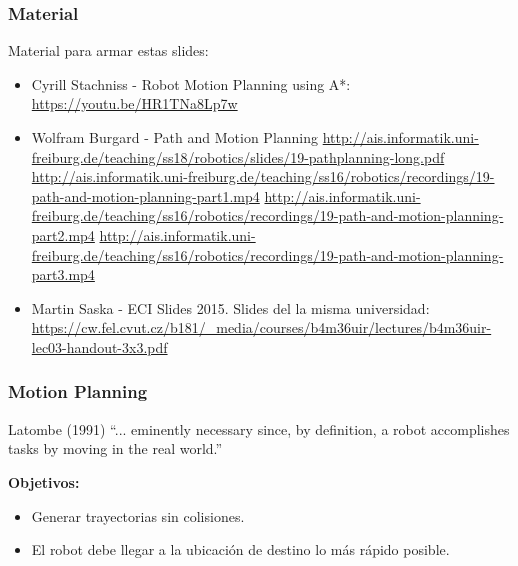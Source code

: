 \begin{frame}
	\frametitle{Material}
	
	Material para armar estas slides:
	\begin{itemize}
		\item Cyrill Stachniss - Robot Motion Planning using A*: \url{https://youtu.be/HR1TNa8Lp7w}
		\item Wolfram Burgard - Path and Motion Planning \url{http://ais.informatik.uni-freiburg.de/teaching/ss18/robotics/slides/19-pathplanning-long.pdf}
		\url{http://ais.informatik.uni-freiburg.de/teaching/ss16/robotics/recordings/19-path-and-motion-planning-part1.mp4}
		\url{http://ais.informatik.uni-freiburg.de/teaching/ss16/robotics/recordings/19-path-and-motion-planning-part2.mp4}
		\url{http://ais.informatik.uni-freiburg.de/teaching/ss16/robotics/recordings/19-path-and-motion-planning-part3.mp4}
		\item Martin Saska - ECI Slides 2015. Slides del la misma universidad: \url{https://cw.fel.cvut.cz/b181/_media/courses/b4m36uir/lectures/b4m36uir-lec03-handout-3x3.pdf}
	\end{itemize}
\end{frame}

\begin{frame}
	\frametitle{Motion Planning}
	
	\begin{block}{Latombe (1991)}
		``... eminently necessary since, by definition, a robot accomplishes tasks by moving in the real world.''
	\end{block}
	
	\textbf{Objetivos:}
	\begin{itemize}
		\item Generar trayectorias sin colisiones.
		\item El robot debe llegar a la ubicación de destino lo más rápido posible.
	\end{itemize}
\end{frame}

